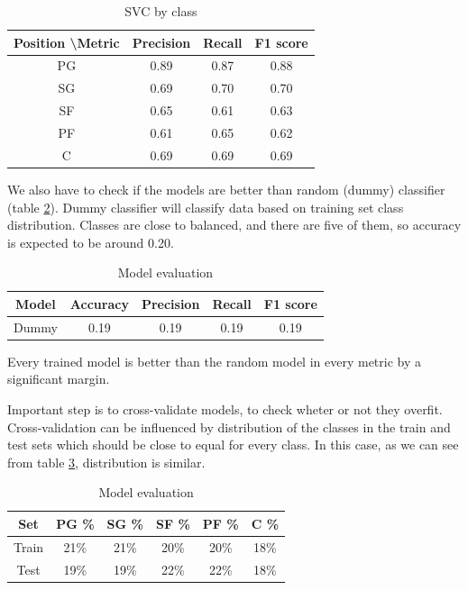 \documentclass[a4paper]{article}
\begin{document}
\begin{table}[!h]
\begin{center}
\begin{tabular}{|c|c|c|c|} \hline
Position \textbackslash Metric & Precision & Recall & F1 score \\ \hline
PG & 0.89 & 0.87 & 0.88 \\ \hline
SG & 0.69 & 0.70 & 0.70 \\ \hline
SF & 0.65 & 0.61 & 0.63 \\ \hline
PF & 0.61 & 0.65 & 0.62 \\ \hline
C & 0.69 & 0.69 & 0.69 \\ \hline
\end{tabular}
\caption{SVC by class}
\label{tab:pos_clf_svc}
\end{center}
\end{table}

We also have to check if the models are better than random (dummy) classifier (table \ref{tab:pos_clf_dummy}). Dummy classifier will classify data based on training set class distribution. Classes are close to balanced, and there are five of them, so accuracy is expected to be around 0.20.

\begin{table}[!h]
\begin{center}
\begin{tabular}{|c|c|c|c|c|} \hline
Model & Accuracy & Precision & Recall & F1 score \\ \hline
Dummy & 0.19 & 0.19 & 0.19 & 0.19 \\ \hline
\end{tabular}
\caption{Model evaluation}
\label{tab:pos_clf_dummy}
\end{center}
\end{table}

Every trained model is better than the random model in every metric by a significant margin.

Important step is to cross-validate models, to check wheter or not they overfit. Cross-validation can be influenced by distribution of the classes in the train and test sets which should be close to equal for every class. In this case, as we can see from table \ref{tab:pos_clf_cross_val}, distribution is similar.

\begin{table}[!h]
\begin{center}
\begin{tabular}{|c|c|c|c|c|c|} \hline
Set & PG \% & SG \% & SF \% & PF \% & C \% \\ \hline
Train & 21\% & 21\% & 20\% & 20\%  & 18\% \\ \hline
Test & 19\% & 19\% & 22\% & 22\% & 18\% \\ \hline
\end{tabular}
\caption{Model evaluation}
\label{tab:pos_clf_cross_val}
\end{center}
\end{table}
\end{document}
